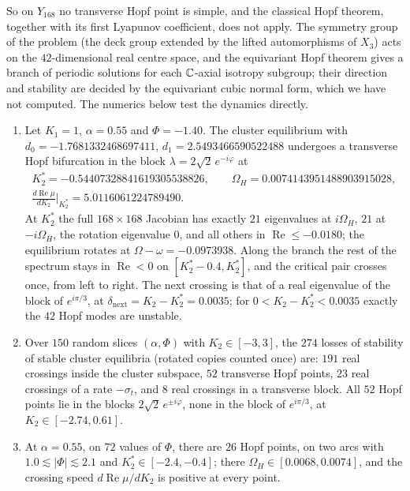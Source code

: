 So on $Y_{168}$ no transverse Hopf point is simple, and the classical Hopf theorem, together with
its first Lyapunov coefficient, does not apply. The symmetry group of the problem (the deck
group extended by the lifted automorphisms of $X_3$) acts on the $42$-dimensional real centre
space, and the equivariant Hopf theorem \cite{GSS88} gives a branch of periodic solutions for each
$\mathbb{C}$-axial isotropy subgroup; their direction and stability are decided by the equivariant cubic
normal form, which we have not computed. The numerics below test the dynamics directly.

\begin{theorem}\label{V3P3:thm:hopf}
\begin{enumerate}
\item[(a)] Let $K_1=1$, $\alpha=0.55$ and $\Phi=-1.40$. The cluster equilibrium with
$d_0=-1.7681332468697411$, $d_1=2.5493466590522488$ undergoes a transverse Hopf bifurcation in the
block $\lambda=2\sqrt2\,e^{-i\varphi}$ at
\begin{gather*}
K_2^{*}=-0.54407328841619305538826,\qquad \Omega_H=0.0074143951488903915028,\\
\frac{d\operatorname{Re}\mu}{dK_2}\Big|_{K_2^{*}}=5.0116061224789490 .
\end{gather*}
At $K_2^{*}$ the full $168\times168$ Jacobian has exactly $21$ eigenvalues at $i\Omega_H$, $21$ at
$-i\Omega_H$, the rotation eigenvalue $0$, and all others in $\operatorname{Re}\le-0.0180$; the
equilibrium rotates at $\Omega-\omega=-0.0973938$. Along the branch the rest of the spectrum stays
in $\operatorname{Re}<0$ on $[K_2^{*}-0.4,K_2^{*}]$, and the critical pair crosses once, from left to
right. The next crossing is that of a real eigenvalue of the block of $e^{i\pi/3}$, at
$\delta_{\mathrm{next}}=K_2-K_2^{*}=0.0035$; for $0<K_2-K_2^{*}<0.0035$ exactly the $42$ Hopf modes are
unstable.
\item[(b)] Over $150$ random slices $(\alpha,\Phi)$ with $K_2\in[-3,3]$, the $274$ losses of stability of
stable cluster equilibria (rotated copies counted once) are: $191$ real crossings inside the
cluster subspace, $52$ transverse Hopf points, $23$ real crossings of a rate $-\sigma_t$, and $8$ real
crossings in a transverse block. All $52$ Hopf points lie in the blocks $2\sqrt2\,e^{\pm i\varphi}$,
none in the block of $e^{i\pi/3}$, at $K_2\in[-2.74,0.61]$.
\item[(c)] At $\alpha=0.55$, on $72$ values of $\Phi$, there are $26$ Hopf points, on two arcs with
$1.0\lesssim|\Phi|\lesssim2.1$ and $K_2^{*}\in[-2.4,-0.4]$; there $\Omega_H\in[0.0068,0.0074]$, and the
crossing speed $d\operatorname{Re}\mu/dK_2$ is positive at every point.
\end{enumerate}
\end{theorem}

